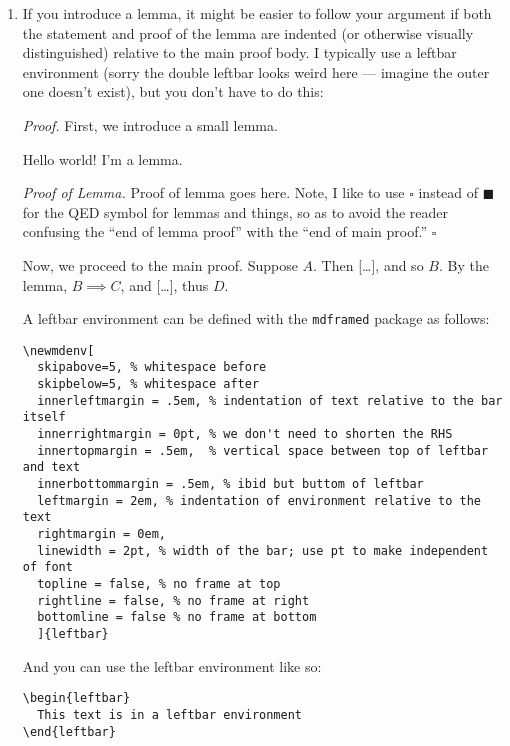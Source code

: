 \documentclass{fkpset}
\begin{document}
\begin{enumerate}[label=(\arabic*)]
\begin{leftbar}
\begin{proof}
        So $A \implies D$, as desired.
      \end{proof}
    \end{leftbar}
    Note, if the proof of each step is only a few lines long, then this isn't
    explicitly necessary. Use your own judgment, and I'll give you feedback if I
    think you should split up your argument more \texttt{:)}
  \item If you introduce a lemma, it might be easier to follow your argument if
    both the statement and proof of the lemma are indented (or otherwise
    visually distinguished) relative to the main proof body. I typically use a
    leftbar environment (sorry the double leftbar looks weird here --- imagine
    the outer one doesn't exist), but you don't have to do this:
    \begin{leftbar}
      \emph{Proof.} First, we introduce a small lemma.
      \begin{leftbar}\vspace{.5em}
        \begin{lemma}
          Hello world! I'm a lemma.
        \end{lemma}
        \emph{Proof of Lemma.} Proof of lemma goes here. Note, I like to use
        $\square$ instead of $\blacksquare$ for the QED symbol for lemmas
        and things, so as to avoid the reader confusing the ``end of lemma
        proof'' with the ``end of main proof.'' \hfill $\square$
      \end{leftbar}
      Now, we proceed to the main proof. Suppose $A$. Then [\ldots], and so
      $B$. By the lemma, $B \implies C$, and [\ldots], thus $D$.
    \end{leftbar}
    A leftbar environment can be defined with the \texttt{mdframed} package
    as follows:
    \begin{lstlisting}
\newmdenv[
  skipabove=5, % whitespace before
  skipbelow=5, % whitespace after
  innerleftmargin = .5em, % indentation of text relative to the bar itself
  innerrightmargin = 0pt, % we don't need to shorten the RHS
  innertopmargin = .5em,  % vertical space between top of leftbar and text
  innerbottommargin = .5em, % ibid but buttom of leftbar
  leftmargin = 2em, % indentation of environment relative to the text
  rightmargin = 0em,
  linewidth = 2pt, % width of the bar; use pt to make independent of font
  topline = false, % no frame at top
  rightline = false, % no frame at right
  bottomline = false % no frame at bottom
  ]{leftbar}\end{lstlisting}
    And you can use the leftbar environment like so:
    \begin{lstlisting}
\begin{leftbar}
  This text is in a leftbar environment
\end{leftbar}\end{lstlisting}
\end{enumerate}
\end{document}
